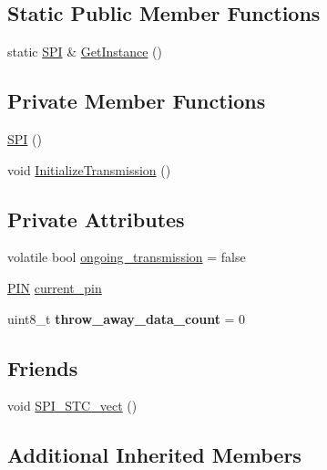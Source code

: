 \subsection*{Static Public Member Functions}
\begin{DoxyCompactItemize}
\item 
static \hyperlink{class_s_p_i___n_1_1_s_p_i}{S\-P\-I} \& \hyperlink{class_s_p_i___n_1_1_s_p_i_abc266ff9d817b8d4437d1da47fe8e7ae}{Get\-Instance} ()
\end{DoxyCompactItemize}
\subsection*{Private Member Functions}
\begin{DoxyCompactItemize}
\item 
\hyperlink{class_s_p_i___n_1_1_s_p_i_a8fec1a6e642a5758acf974b92e28a9e6}{S\-P\-I} ()
\item 
void \hyperlink{class_s_p_i___n_1_1_s_p_i_af973a5b4a970c3c01430037d578151ef}{Initialize\-Transmission} ()
\end{DoxyCompactItemize}
\subsection*{Private Attributes}
\begin{DoxyCompactItemize}
\item 
volatile bool \hyperlink{class_s_p_i___n_1_1_s_p_i_a89115bf64f31cd26d0b6ed3292decabb}{ongoing\-\_\-transmission} = false
\item 
\hyperlink{struct_s_p_i___n_1_1_p_i_n}{P\-I\-N} \hyperlink{class_s_p_i___n_1_1_s_p_i_ac016c4eaed2db3f8b5523bf0d472ddd2}{current\-\_\-pin}
\item 
\hypertarget{class_s_p_i___n_1_1_s_p_i_aaed8cc6f36275c3e33fcada1b9172742}{uint8\-\_\-t {\bfseries throw\-\_\-away\-\_\-data\-\_\-count} = 0}\label{class_s_p_i___n_1_1_s_p_i_aaed8cc6f36275c3e33fcada1b9172742}

\end{DoxyCompactItemize}
\subsection*{Friends}
\begin{DoxyCompactItemize}
\item 
void \hyperlink{class_s_p_i___n_1_1_s_p_i_a96543550133e0b0c6ae83faad5c0d68d}{S\-P\-I\-\_\-\-S\-T\-C\-\_\-vect} ()
\end{DoxyCompactItemize}
\subsection*{Additional Inherited Members}


